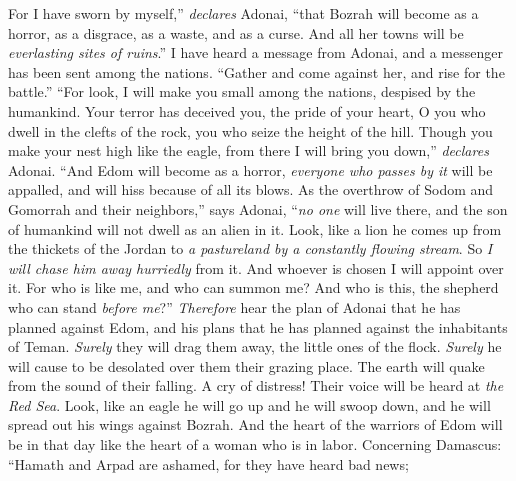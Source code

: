 \begin{biblechapter}
\verse For I have sworn by myself,” \textit{declares} Adonai, “that Bozrah will become as a horror, as a disgrace, as a waste, and as a curse. And all her towns will be \textit{everlasting sites of ruins}.”
\verse I have heard a message from Adonai, 
and a messenger has been sent among the nations. 
“Gather and come against her, 
and rise for the battle.”
\verse “For look, I will make you small among the nations, 
despised by the humankind.
\verse Your terror has deceived you, 
the pride of your heart, 
O you who dwell in the clefts of the rock, 
you who seize the height of the hill. 
Though you make your nest high like the eagle, 
from there I will bring you down,” \textit{declares} Adonai.
\verse “And Edom will become as a horror, 
\textit{everyone who passes by it} will be appalled, 
and will hiss because of all its blows.
\verse As the overthrow of Sodom and Gomorrah 
and their neighbors,” says Adonai, 
“\textit{no one} will live there, 
and the son of humankind will not dwell as an alien in it.
\verse Look, like a lion he comes up from the thickets of the Jordan 
to \textit{a pastureland by a constantly flowing stream}. 
So \textit{I will chase him away hurriedly} from it. 
And whoever is chosen I will appoint over it. 
For who is like me, and who can summon me? 
And who is this, the shepherd who can stand \textit{before me}?”
\verse \textit{Therefore} hear the plan of Adonai that he has planned against Edom, 
and his plans that he has planned against the inhabitants of Teman. 
\textit{Surely} they will drag them away, 
the little ones of the flock. 
\textit{Surely} he will cause to be desolated over them 
their grazing place.
\verse The earth will quake from the sound of their falling. 
A cry of distress! Their voice will be heard at \textit{the Red Sea}.
\verse Look, like an eagle he will go up and he will swoop down, 
and he will spread out his wings against Bozrah. 
And the heart of the warriors of Edom will be in that day 
like the heart of a woman who is in labor.
 Concerning Damascus:
\verse “Hamath and Arpad are ashamed, 
for they have heard bad news; 

\end{biblechapter}
